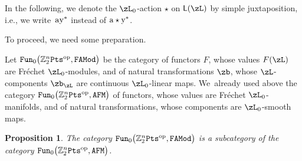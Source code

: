 \documentclass[pdftex]{sigma}%
\newcommand{\op}[1]{\operatorname{#1}}
\newcommand{\Z}{{\mathbb Z}}
\newcommand{\0}{\otimes}
\newcommand{\z}{\Z_2^n}
\numberwithin{equation}{section}
\newtheorem{Proposition}[Theorem]{Proposition}
 { \theoremstyle{definition}
\newtheorem{Definition}[Theorem]{Definition}
\newtheorem{Example}[Theorem]{Example}
\newtheorem{Remark}[Theorem]{Remark} }
\begin{document}
In the following, we denote the $\zL_0$-action $\star$ on ${\sf L}(\zL)$ by simple juxtaposition, i.e., we write~${\rm a}{\rm y^*}$ instead of ${\rm a}\star{\rm y}^*$.

To proceed, we need some preparation.

Let ${\tt Fun}_0\big(\z{\tt Pts}^{\op{op}},{\tt FAMod}\big)$ be the category of functors $F$, whose values $F(\zL)$ are Fr\'echet $\zL_0$-modules, and of natural transformations $\zb$, whose $\zL$-components $\zb_\zL$ are continuous $\zL_0$-linear maps. We~already used above the category ${\tt Fun}_0\big(\z{\tt Pts}^{\op{op}},{\tt AFM}\big)$ of functors, whose values are Fr\'echet $\zL_0$-manifolds, and of natural transformations, whose components are $\zL_0$-smooth maps.

{\sloppy\begin{Proposition}%
The category ${\tt Fun}_0\big(\z{\tt Pts}^{\op{op}},{\tt FAMod}\big)$ is a subcategory of the category ${\tt Fun}_0\big(\z{\tt Pts}^{\op{op}},{\tt AFM}\big)$.
\end{Proposition}

}
\end{document}
